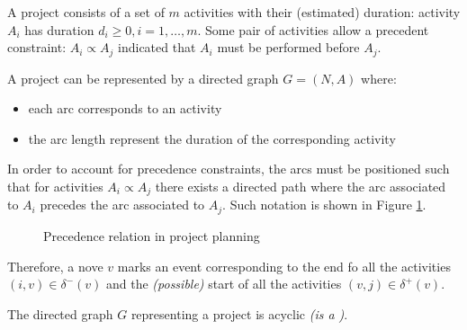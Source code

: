 \documentclass[english]{article}
\begin{document}
\begin{problem}
A project consists of a set of \(m\) activities with their (estimated) duration: activity \(A_i\) has duration \(d_i \geq 0, i = 1, \ldots, m\).
Some pair of activities allow a precedent constraint: \(A_i \propto A_j\) indicated that \(A_i\) must be performed before \(A_j\).

A project can be represented by a directed graph \(G = (N, A)\) where:
\begin{itemize}
  \item each arc corresponds to an activity
  \item the arc length represent the duration of the corresponding activity
\end{itemize}
\end{problem}

\bigskip

In order to account for precedence constraints, the arcs must be positioned such that for activities \(A_i \propto A_j\) there exists a directed path where the arc associated to \(A_i\) precedes the arc associated to \(A_j\).
Such notation is shown in Figure \ref{fig:precedence-relation-in-project-planning}.

\begin{figure}[htbp]
  \centering
  \bigskip
  \bigskip
  \caption{Precedence relation in project planning}
  \label{fig:precedence-relation-in-project-planning}
\end{figure}

Therefore, a nove \(v\) marks an event corresponding to the end fo all the activities \(\left( i, v \right) \in \delta^-(v)\) and the \textit{(possible)} start of all the activities \(\left( v, j \right) \in \delta^+(v)\).

\bigskip

\begin{property}
  The directed graph \(G\) representing a project is acyclic \textit{(is a \DAG)}.
\end{property}
\end{document}
